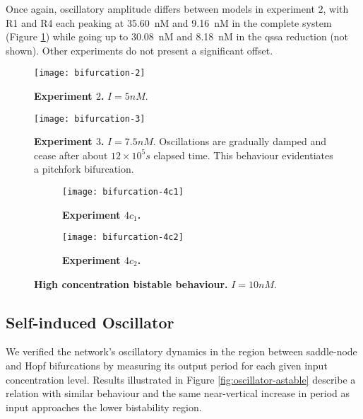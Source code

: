     Once again, oscillatory amplitude differs between models in experiment $2$, with R1 and R4 each peaking at \SI{35.60}{\nano M} and \SI{9.16}{\nano M} in the complete system (Figure \ref{fig:bifurcation-2}) while going up to \SI{30.08}{\nano M} and \SI{8.18}{\nano M} in the \ac{qssa} reduction (not shown).
    Other experiments do not present a significant offset.

    \begin{figure}[!htbp]
      \centering
      \texttt{[image: bifurcation-2]}
      \caption{\textbf{Experiment $2$.} $I = 5 nM$.}
      \label{fig:bifurcation-2}
    \end{figure}

    \begin{figure}[!htbp]
      \centering
      \texttt{[image: bifurcation-3]}
      \caption{\textbf{Experiment $3$.} $I = 7.5nM$. Oscillations are gradually damped and cease after about $12 \times 10^5 s$ elapsed time. This behaviour evidentiates a pitchfork bifurcation.}
      \label{fig:bifurcation-3}
    \end{figure}

    \begin{figure}[!htb]
      \centering
      \begin{subfigure}[t]{0.7\textwidth}
        \centering
        \texttt{[image: bifurcation-4c1]}
        \caption{\textbf{Experiment $4c_{1}$.}}
        \label{fig:bifurcation-4c1}
      \end{subfigure}
      \begin{subfigure}[t]{0.7\textwidth}
        \centering
        \texttt{[image: bifurcation-4c2]}
        \caption{\textbf{Experiment $4c_{2}$.}}
        \label{fig:bifurcation-4c2}
      \end{subfigure}
      \caption{\textbf{High concentration bistable behaviour.} $I = 10 nM$.}
      \label{fig:bifurcation-4}
    \end{figure}


  \subsection{Self-induced Oscillator}

    We verified the network's oscillatory dynamics in the region between saddle-node and Hopf bifurcations by measuring its output period for each given input concentration level.
    Results illustrated in Figure \ref{fig:oscillator-astable} describe a relation with similar behaviour and the same near-vertical increase in period as input approaches the lower bistability region.

